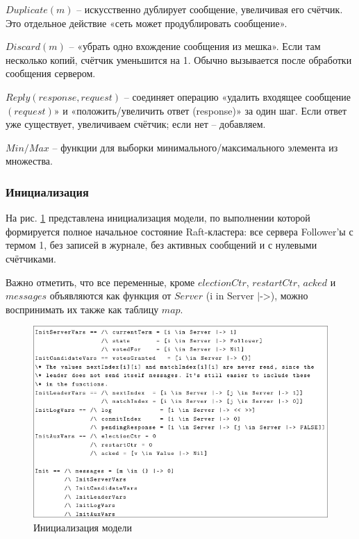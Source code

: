 $Duplicate(m)$ – искусственно дублирует сообщение, увеличивая его счётчик.
Это отдельное действие «сеть может продублировать сообщение».

$Discard(m)$ – «убрать одно вхождение сообщения из мешка». Если там несколько
копий, счётчик уменьшится на 1. Обычно вызывается после обработки сообщения
сервером.

$Reply(response, request)$ – соединяет операцию «удалить входящее сообщение
$(request)$» и «положить/увеличить ответ (response)» за один шаг. Если ответ уже
существует, увеличиваем счётчик; если нет – добавляем.

$Min/Max$ – функции для выборки минимального/максимального элемента из множества.

\subsubsection*{Инициализация}

На рис. \ref{fig:tla-05} представлена инициализация модели, по выполнении которой
формируется полное начальное состояние Raft-кластера: все сервера Follower’ы с
термом 1, без записей в журнале, без активных сообщений и с нулевыми счётчиками.

Важно отметить, что все переменные, кроме $electionCtr$, $restartCtr$, $acked$ и
$messages$ объявляются как функция от $Server$ ($\text{i in Server |->}$), можно
воспринимать их также как таблицу $map$.

\begin{figure}
  \centering
  \includegraphics[scale=0.6]{inc/tla-05.png}
  \caption{Инициализация модели}
  \label{fig:tla-05}
\end{figure}

